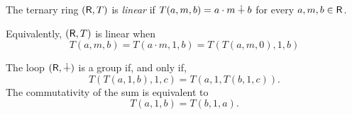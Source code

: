 \begin{defn}
    The ternary ring $(\mathsf R,T)$ is \textsl{linear} if $T(a,m,b)=a\cdot m\dotplus b$ for every $a,m,b\in\mathsf R$.
\end{defn}

\begin{rem}\label{rem:linear-ternary-ring}
    Equivalently, $(\mathsf R,T)$ is linear when
    \[
        T(a,m,b)=T(a\cdot m,1,b)=T(T(a,m,0),1,b)
    \]
\end{rem}

\begin{rem}\label{rem:ternary-sum-group}
    The loop $(\mathsf R,\dotplus)$ is a group if, and only if,
    \[
        T(T(a,1,b),1,c) = T(a,1,T(b,1,c)).
    \]
    The commutativity of the sum is equivalent to
    \[
        T(a,1,b)=T(b,1,a).
    \]
\end{rem}

